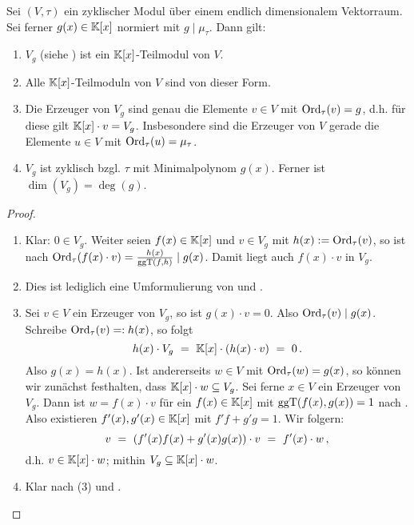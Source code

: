 \begin{satz}
  \label{satz:moduln_ueber_v_g}
  Sei $(V,\tau)$ ein zyklischer Modul über einem endlich dimensionalem
  Vektorraum. Sei ferner $g(x)\in \mathbb{K}[x]$ normiert mit $g\mid \mu_\tau$. 
  Dann gilt:
  \begin{enumerate}
    \item $V_g$ (siehe ) ist ein $\mathbb{K}[x]$-Teilmodul von $V$.
    \item Alle $\mathbb{K}[x]$-Teilmoduln von $V$ sind von dieser Form.
    \item Die Erzeuger von $V_g$ sind genau die Elemente $v\in V$ mit 
      $\operatorname{Ord}_\tau(v) = g$, d.h. für diese gilt
      $\mathbb{K}[x]\cdot v = V_g$.
      Insbesondere sind die Erzeuger von $V$ gerade die Elemente $u\in V$ mit
      $\operatorname{Ord}_\tau(u) = \mu_\tau$.
    \item $V_g$ ist zyklisch bzgl. $\tau$ mit Minimalpolynom $g(x)$.
      Ferner ist $\dim(V_g) = \deg(g)$.
  \end{enumerate}
\end{satz}
\begin{proof}
  \begin{enumerate}
    \item Klar: $0\in V_g$. Weiter seien $f(x) \in \mathbb{K}[x]$ und 
      $v \in V_g$ mit $h(x) := \operatorname{Ord}_\tau(v)$, 
      so ist nach 
      $\operatorname{Ord}_\tau(f(x)\cdot v) = \frac{h(x)}{\operatorname{ggT}(f,h)} \mid g(x)$.
      Damit liegt auch $f(x)\cdot v$ in $V_g$.
    \item Dies ist lediglich eine Umformulierung von
      und .
    \item Sei $v \in V$ ein Erzeuger von $V_g$, so ist 
      $g(x)\cdot v = 0$. Also $\operatorname{Ord}_\tau(v) \mid g(x)$. Schreibe
      $\operatorname{Ord}_\tau(v) =: h(x)$, so folgt
      \[ h(x)\cdot V_g \ =\  \mathbb{K}[x]\cdot (h(x)\cdot v) \ =\ 0\,.\]
      Also $g(x) = h(x)$.
      Ist andererseits $w \in V$ mit $\operatorname{Ord}_\tau(w) = g(x)$, 
      so können wir zunächst festhalten, dass $\mathbb{K}[x] \cdot w \subseteq V_g$.
      Sei ferne $x \in V$ ein Erzeuger von $V_g$. Dann ist $w = f(x)\cdot v$ für
      ein $f(x)\in \mathbb{K}[x]$ mit $\operatorname{ggT}(f(x),g(x)) = 1$ nach 
      . Also existieren
      $f'(x),g'(x)\in \mathbb{K}[x]$ mit $f'f + g'g = 1$. Wir folgern:
      \[ v \ =\  (f'(x)f(x) + g'(x)g(x)) \cdot v \ =\ 
        f'(x)\cdot w\,,\]
      d.h. $v \in \mathbb{K}[x]\cdot w$; mithin $V_g \subseteq \mathbb{K}[x]\cdot w$.
    \item Klar nach (3) und .
  \end{enumerate}
\end{proof}


